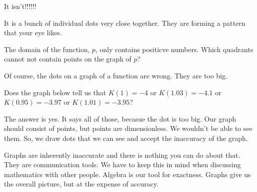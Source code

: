 \documentclass{ximera}
\begin{document}
It isn't!!!!!!

It is a bunch of individual dots very close together. They are forming a pattern that your eye likes.





\begin{example}
The domain of the function, $p$, only contains positicve numbers.  Which quadrants cannot not contain points on the graph of $p$?

\begin{selectAll}
\end{selectAll}

\end{example}



Of course, the dots on a graph of a function are wrong. They are too big.

Does the graph below tell us that $K(1) = -4$ or $K(1.03) = -4.1$ or $K(0.95) = -3.97$ or $K(1.01) = -3.95$?

\begin{image}
\end{image}

The answer is yes.  It says all of those, becasue the dot is too big.  Our graph should consist of points, but points are dimensionless.  We wouldn't be able to see them.  So, we draw dots that we can see and accept the inaccuracy of the graph.

Graphs are inherently inaccurate and there is nothing you can do about that.  They are communication tools. We have to keep this in mind when discussing mathematics with other people. Algebra is our tool for exactness.  Graphs give us the overall picture, but at the expense of accuracy.
\end{document}
